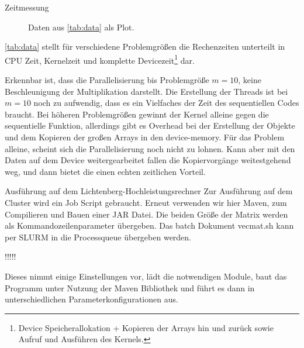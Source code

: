 \documentclass[
ngerman,
subtask=ruled %
]{tudaexercise}
\begin{document}
\begin{task}{Zeitmessung}
\begin{figure}[H]
			\caption{Daten aus \autoref{tab:data} als Plot.}
		\end{figure}
		
		\autoref{tab:data} stellt für verschiedene Problemgrößen die Rechenzeiten unterteilt in CPU Zeit, Kernelzeit und komplette Devicezeit\footnote{Device Speicherallokation + Kopieren der Arrays hin und zurück sowie Aufruf und Ausführen des Kernels.} dar.
		
		Erkennbar ist, dass die Parallelisierung bis Problemgröße $m=10$, keine Beschleunigung der Multiplikation darstellt.
		Die Erstellung der Threads ist bei $m=10$ noch zu aufwendig, dass es ein Vielfaches der Zeit des sequentiellen Codes braucht.
		Bei höheren Problemgrößen gewinnt der Kernel alleine gegen die sequentielle Funktion, allerdings gibt es Overhead bei der Erstellung der Objekte und dem Kopieren der großen Arrays in den device-memory.
		Für das Problem alleine, scheint sich die Parallelisierung noch nicht zu lohnen.
		Kann aber mit den Daten auf dem Device weitergearbeitet fallen die Kopiervorgänge weitestgehend weg, und dann bietet die einen echten zeitlichen Vorteil.
		
	\end{task}
	
	\begin{task}{Ausführung auf dem Lichtenberg-Hochleistungsrechner} 
		Zur Ausführung auf dem Cluster wird ein Job Script gebraucht. Erneut verwenden wir hier Maven, zum Compilieren und Bauen einer JAR Datei.
		Die beiden Größe der Matrix werden als Kommandozeilenparameter übergeben.
		Das batch Dokument vecmat.sh kann per SLURM in die Processqueue übergeben werden.
		
		!!!!!
		
		Dieses nimmt einige Einstellungen vor, lädt die notwendigen Module, baut das Programm unter Nutzung der Maven Bibliothek und führt es dann in unterschiedlichen Parameterkonfigurationen aus.
	\end{task}

	
\end{document}
